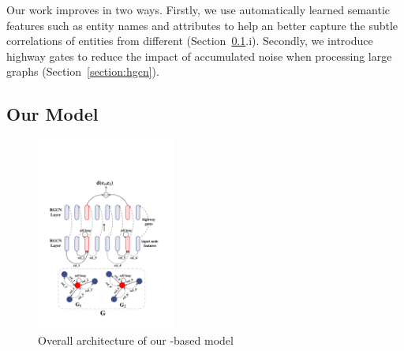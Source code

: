  Our work improves \RGCNs in two ways. Firstly, we use automatically learned semantic features such as entity names and attributes to
 help an \RGCN better capture the subtle correlations of entities from different \KGs (Section~\ref{section:rgcn}.i).
    Secondly, we introduce highway gates to reduce the impact of accumulated noise when processing large graphs (Section~\ref{section:hgcn}).




	



	
	\subsection{Our Model}
	\label{section:rgcn}	
\begin{figure}[t!]
	\centering
	\includegraphics[width=0.4\textwidth]{figures/RGCN.pdf}
	\caption{Overall architecture of our \RGCN-based model}\label{fig:all}
\end{figure}


